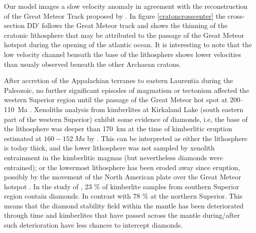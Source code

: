 \documentclass[12pt]{article}
\begin{document}
		Our model images a slow velocity anomaly in agreement with the reconstruction of the Great Meteor Track proposed by \cite{heaman2000timing}.
		In figure \ref{cratoncrosscenter} the cross-section DD' follows the Great Meteor track and shows the thinning of the cratonic lithosphere that may be attributed to the passage of the Great Meteor hotspot during the opening of the atlantic ocean.
		It is interesting to note that the low velocity channel beneath the base of the lithosphere shows lower velocities than usualy observed beneath the other Archaean cratons. 


		

		After accretion of the Appalachian terranes to eastern Laurentia during the Paleozoic, no further significant episodes of magmatism or tectonism affected the western Superior region until the passage of the Great Meteor hot spot at 200–110~Ma \cite{heaman2000timing,villemaire2012p}.
		Xenoliths analysis from kimberlites at Kirkaland Lake (south eastern part of the western Superior) exhibit some evidence of diamonds, i.e, the base of the lithosphere was deeper than 170~km at the time of kimberlitic eruption \citep{jones2014electrical} estimated at $160 - 152 \: Ma$ by \cite{heaman2000timing,heaman2003timing}. 
		This can be interpreted as either the lithosphere is today thick, and the lower lithosphere was not sampled by xenolith entrainment in the kimberlitic magmas (but nevertheless diamonds were entrained); or the lowermost lithosphere has been eroded away since eruption, possibly by the movement of the North American plate over the Great Meteor hotspot \citep{heaman2000timing,villemaire2012p,jones2014electrical}. In the study of \cite{faure2011seismic}, 23 $\%$ of kimberlite samples from southern Superior region contain diamonds. In contrast with 78 $\%$ at the northern Superior. This means that the diamond stability field within the mantle has been deteriorated through time and kimberlites that have passed across the mantle during/after such deterioration have less chances to intercept diamonds. \citep{faure2011seismic}
\end{document}
